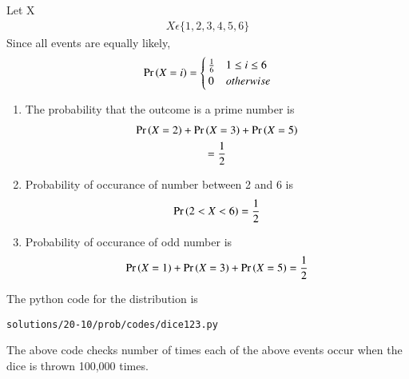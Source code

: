 Let X 
\begin{align}
X \epsilon \{1,2,3,4,5,6\}
\end{align}
Since all events are equally likely,
\begin{align}
\Pr\left(X=i\right)=\begin{cases}
	\frac{1}{6}& 1 \le i \le 6\\
	0 & otherwise
	\end{cases}
\end{align}
\begin{enumerate}
\item The probability that the outcome is a prime number is 
\begin{multline}
\Pr\left(X=2\right)+\Pr\left(X=3\right)+\Pr\left(X=5\right) \\
=\frac{1}{2}
\end{multline}

\item Probability of occurance of number between 2 and 6 is
\begin{align}
\Pr\left(2 < X < 6\right)=\frac{1}{2}
\end{align}
\item Probability of occurance of odd number is
\begin{align}
\Pr\left(X=1\right)+\Pr\left(X=3\right)+\Pr\left(X=5\right)=\frac{1}{2}
\end{align}
\end{enumerate}

The python code for the distribution is
\begin{lstlisting}
solutions/20-10/prob/codes/dice123.py
\end{lstlisting}
The above code checks number of times each of the above events occur when the dice is thrown 100,000 times.

